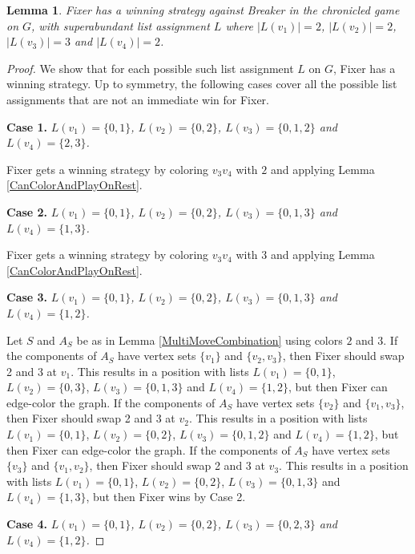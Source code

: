 \documentclass[12pt]{amsart}
\theoremstyle{plain}
\newtheorem{lem}[thm]{Lemma}
\theoremstyle{definition}
\theoremstyle{remark}
\begin{document}
\begin{lem}\label{P_4-tash2}
Fixer has a winning strategy against Breaker in the chronicled game on $G$, with superabundant list assignment $L$ where $|L(v_1)| = 2$, $|L(v_2)| = 2$, $|L(v_3)| = 3$ and $|L(v_4)| = 2$.
\end{lem}
\begin{proof}
We show that for each possible such list assignment $L$ on $G$, Fixer has a winning strategy.
Up to symmetry, the following cases cover all the possible list assignments that are not an immediate win for Fixer.

\noindent\textbf{Case 1.  }\textit{$L(v_1) = \{0, 1\}$, $L(v_2) = \{0, 2\}$, $L(v_3) = \{0, 1, 2\}$ and $L(v_4) = \{2, 3\}$.}

Fixer gets a winning strategy by coloring $v_3v_4$ with $2$ and applying Lemma \ref{CanColorAndPlayOnRest}.

\noindent\textbf{Case 2.  }\textit{$L(v_1) = \{0, 1\}$, $L(v_2) = \{0, 2\}$, $L(v_3) = \{0, 1, 3\}$ and $L(v_4) = \{1, 3\}$.}

Fixer gets a winning strategy by coloring $v_3v_4$ with $3$ and applying Lemma \ref{CanColorAndPlayOnRest}.

\noindent\textbf{Case 3.  }\textit{$L(v_1) = \{0, 1\}$, $L(v_2) = \{0, 2\}$, $L(v_3) = \{0, 1, 3\}$ and $L(v_4) = \{1, 2\}$.}

Let $S$ and $A_S$ be as in Lemma \ref{MultiMoveCombination} using colors $2$ and $3$. If the components of $A_S$ have vertex sets $\{v_1\}$ and $\{v_2, v_3\}$, then Fixer should swap 2 and 3 at $v_1$. This results in a position with lists $L(v_1) = \{0, 1\}$, $L(v_2) = \{0, 3\}$, $L(v_3) = \{0, 1, 3\}$ and $L(v_4) = \{1, 2\}$, but then Fixer can edge-color the graph. If the components of $A_S$ have vertex sets $\{v_2\}$ and $\{v_1, v_3\}$, then Fixer should swap 2 and 3 at $v_2$. This results in a position with lists $L(v_1) = \{0, 1\}$, $L(v_2) = \{0, 2\}$, $L(v_3) = \{0, 1, 2\}$ and $L(v_4) = \{1, 2\}$, but then Fixer can edge-color the graph. If the components of $A_S$ have vertex sets $\{v_3\}$ and $\{v_1, v_2\}$, then Fixer should swap 2 and 3 at $v_3$. This results in a position with lists $L(v_1) = \{0, 1\}$, $L(v_2) = \{0, 2\}$, $L(v_3) = \{0, 1, 3\}$ and $L(v_4) = \{1, 3\}$, but then Fixer wins by Case 2. 

\noindent\textbf{Case 4.  }\textit{$L(v_1) = \{0, 1\}$, $L(v_2) = \{0, 2\}$, $L(v_3) = \{0, 2, 3\}$ and $L(v_4) = \{1, 2\}$.}


\end{proof}
\end{document}
